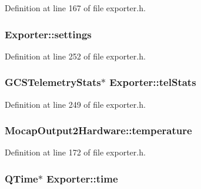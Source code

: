 Definition at line 167 of file exporter.\-h.

\hypertarget{group___mo_cap_plugin_ga50484fe9f9410948c133b1c589f73f76}{
\subsubsection[{settings}]{ Exporter\-::settings\hspace{0.3cm}{\ttfamily [protected]}}}\label{group___mo_cap_plugin_ga50484fe9f9410948c133b1c589f73f76}


Definition at line 252 of file exporter.\-h.

\hypertarget{group___mo_cap_plugin_gad3a5a6122f88f8f4b44847053a7d830b}{
\subsubsection[{tel\-Stats}]{\setlength{\rightskip}{0pt plus 5cm}G\-C\-S\-Telemetry\-Stats$\ast$ Exporter\-::tel\-Stats\hspace{0.3cm}{\ttfamily [protected]}}}\label{group___mo_cap_plugin_gad3a5a6122f88f8f4b44847053a7d830b}


Definition at line 249 of file exporter.\-h.

\hypertarget{group___mo_cap_plugin_gaa66ae80cf0902b622dea302a9a588fe8}{
\subsubsection[{temperature}]{ Mocap\-Output2\-Hardware\-::temperature}}\label{group___mo_cap_plugin_gaa66ae80cf0902b622dea302a9a588fe8}


Definition at line 172 of file exporter.\-h.

\hypertarget{group___mo_cap_plugin_gac71372aac301b0f6d2ae67c3a5c4be63}{
\subsubsection[{time}]{\setlength{\rightskip}{0pt plus 5cm}Q\-Time$\ast$ Exporter\-::time\hspace{0.3cm}{\ttfamily [protected]}}}\label{group___mo_cap_plugin_gac71372aac301b0f6d2ae67c3a5c4be63}


